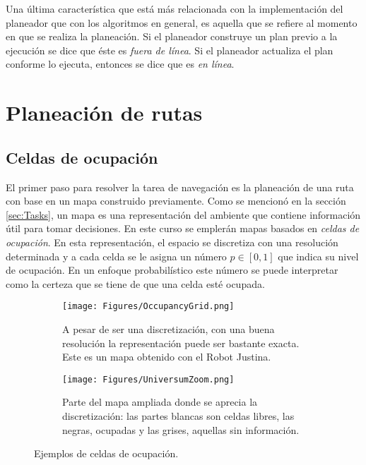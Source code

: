 \documentclass[a4paper]{article}
\begin{document}
Una última característica que está más relacionada con la implementación del planeador que con los algoritmos en general, es aquella que se refiere al momento en que se realiza la planeación. Si el planeador construye un plan previo a la ejecución se dice que éste es \textit{fuera de línea}. Si el planeador actualiza el plan conforme lo ejecuta, entonces se dice que es \textit{en línea}.

\section{Planeación de rutas}
\label{sec:PathPlanning}
\subsection{Celdas de ocupación}

El primer paso para resolver la tarea de navegación es la planeación de una ruta con base en un mapa construido previamente. Como se mencionó en la sección \ref{sec:Tasks}, un mapa es una representación del ambiente que contiene información útil para tomar decisiones. En este curso se emplerán mapas basados en \textit{celdas de ocupación}. En esta representación, el espacio se discretiza con una resolución determinada y a cada celda se le asigna un número $p\in[0,1]$ que indica su nivel de ocupación. En un enfoque probabilístico este número se puede interpretar como la certeza que se tiene de que una celda esté ocupada. 
\begin{figure}
  \centering
  \begin{subfigure}{0.4\textwidth}
    \centering
    \texttt{[image: Figures/OccupancyGrid.png]}
    \caption{A pesar de ser una discretización, con una buena resolución la representación puede ser bastante exacta. Este es un mapa obtenido con el Robot Justina.}
  \end{subfigure}
  \hspace{0.05\textwidth}
  \begin{subfigure}{0.4\textwidth}
    \centering
    \texttt{[image: Figures/UniversumZoom.png]}
    \caption{Parte del mapa ampliada donde se aprecia la discretización: las partes blancas son celdas libres, las negras, ocupadas y las grises, aquellas sin información.}
  \end{subfigure}
  \caption{Ejemplos de celdas de ocupación.}
  \label{fig:OccGrids}
\end{figure}
\end{document}
